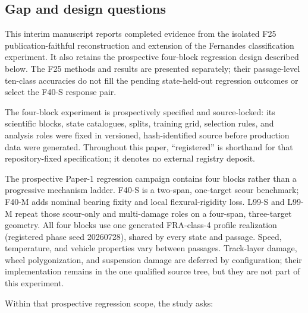 \subsection{Gap and design questions}
\label{sec:gap}

This interim manuscript reports completed evidence from the isolated F25
publication-faithful reconstruction and extension of the Fernandes
classification experiment. It also retains the prospective four-block
regression design described below. The F25 methods and results are presented
separately; their passage-level ten-class accuracies do not fill the pending
state-held-out regression outcomes or select the F40-S response pair.

The four-block experiment is prospectively specified and source-locked:
its scientific blocks, state catalogues, splits, training grid, selection
rules, and analysis roles were fixed in versioned, hash-identified source
before production data were generated. Throughout this paper, ``registered''
is shorthand for that repository-fixed specification; it denotes no external
registry deposit.

The prospective Paper-1 regression campaign contains four blocks rather than a progressive
mechanism ladder. F40-S is a two-span, one-target scour benchmark; F40-M adds
nominal bearing fixity and local flexural-rigidity loss. L99-S and L99-M repeat
those scour-only and multi-damage roles on a four-span, three-target geometry.
All four blocks use one generated FRA-class-4 profile realization (registered
phase seed 20260728), shared by every state and passage. Speed, temperature,
and vehicle properties vary between passages.
Track-layer damage, wheel polygonization, and suspension damage are deferred by
configuration; their implementation remains in the one qualified source tree,
but they are not part of this experiment.

Within that prospective regression scope, the study asks:

